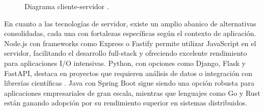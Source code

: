 
\begin{figure}[H]
    \centering
    \caption{Diagrama cliente-servidor \cite{clienteservidorfoto}.}
\end{figure}




En cuanto a las tecnologías de servidor, existe un amplio abanico de alternativas consolidadas, cada una con fortalezas específicas según el contexto de aplicación. Node.js con frameworks como Express o Fastify permite utilizar JavaScript en el servidor, facilitando el desarrollo full-stack y ofreciendo excelente rendimiento para aplicaciones I/O intensivas. Python, con opciones como Django, Flask y FastAPI, destaca en proyectos que requieren análisis de datos o integración con librerías científicas \cite{Castro2023_PythonDataScience}. Java con Spring Boot sigue siendo una opción robusta para aplicaciones empresariales de gran escala, mientras que lenguajes como Go y Rust están ganando adopción por su rendimiento superior en sistemas distribuidos. %


